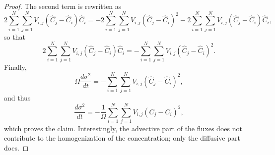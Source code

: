 \begin{proof}
	The second term is rewritten as
	\begin{equation}
 		2 \sum_{i=1}^N \sum_{j=1}^N V_{i,j} (\hat C_j - \hat C_i) \hat C_i = -2 \sum_{i=1}^N \sum_{j=1}^N V_{i,j} (\hat C_j - \hat C_i)^2 - 2\sum_{i=1}^N \sum_{j=1}^N V_{i,j} (\hat C_j - \hat C_i) \hat C_i,
	 \end{equation} 
	 so that
	 \begin{equation}
	 	2 \sum_{i=1}^N \sum_{j=1}^N V_{i,j} (\hat C_j - \hat C_i) \hat C_i = - \sum_{i=1}^N \sum_{j=1}^N V_{i,j} (\hat C_j - \hat C_i)^2.
	 \end{equation}
	 Finally,
	 \begin{equation}
	 	\Omega \frac{d \sigma^2}{dt} = - \sum_{i=1}^N \sum_{j=1}^N V_{i,j} (\hat C_j - \hat C_i)^2,
	 \end{equation}
	 and thus
	 \begin{equation}
	 	\frac{d \sigma^2}{dt} = -\frac{1}{\Omega} \sum_{i=1}^N \sum_{j=1}^N V_{i,j} (C_j - C_i)^2,
	 \end{equation}
	 which proves the claim.  Interestingly, the advective part of the fluxes does not contribute to the homogenization of the concentration; only the diffusive part does.
\end{proof}

